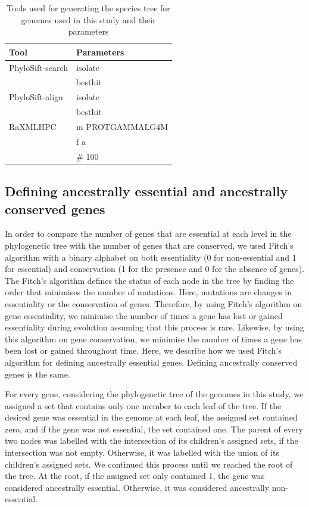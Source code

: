 \documentclass[12pt,letterpaper]{article}
\begin{document}
\begin{table}[]
\caption{Tools used for generating the species tree for genomes used in this study and their parameters}
\label{tab:param}
\begin{tabular}{ll}
\textbf{Tool} & \textbf{Parameters}\\
\hline
\hline
PhyloSift-search & isolate \\
 & besthit \\
\hline
PhyloSift-align & isolate \\
 & besthit \\
\hline
RaXMLHPC & m PROTGAMMALG4M \\
 & f a \\
 & $\#$ 100\\
\end{tabular}
\end{table}

\subsection{Defining ancestrally essential and ancestrally conserved genes}\label{meth:fitch}
In order to compare the number of genes that are essential at each level in the phylogenetic tree with the number of genes that are conserved, we used Fitch's algorithm \cite{fitch_toward_1971} with a binary alphabet on both essentiality (0 for non-essential and 1 for essential) and conservation (1 for the presence and 0 for the absence of genes). The Fitch's algorithm defines the status of each node in the tree by finding the order that minimises the number of mutations. Here, mutations are changes in essentiality or the conservation of genes. Therefore, by using Fitch's algorithm on gene essentiality, we minimise the number of times a gene has lost or gained essentiality during evolution assuming that this process is rare. Likewise, by using this algorithm on gene conservation, we minimise the number of times a gene has been lost or gained throughout time. Here, we describe how we used Fitch's algorithm for defining ancestrally essential genes. Defining ancestrally conserved genes is the same.

For every gene, considering the phylogenetic tree of the genomes in this study, we assigned a set that contains only one member to each leaf of the tree. If the desired gene was essential in the genome at each leaf, the assigned set contained zero, and if the gene was not essential, the set contained one. The parent of every two nodes was labelled with the intersection of its children's assigned sets, if the intersection was not empty. Otherwise, it was labelled with the union of its children's assigned sets. We continued this process until we reached the root of the tree. At the root, if the assigned set only contained 1, the gene was considered ancestrally essential. Otherwise, it was considered ancestrally non-essential.
\end{document}
